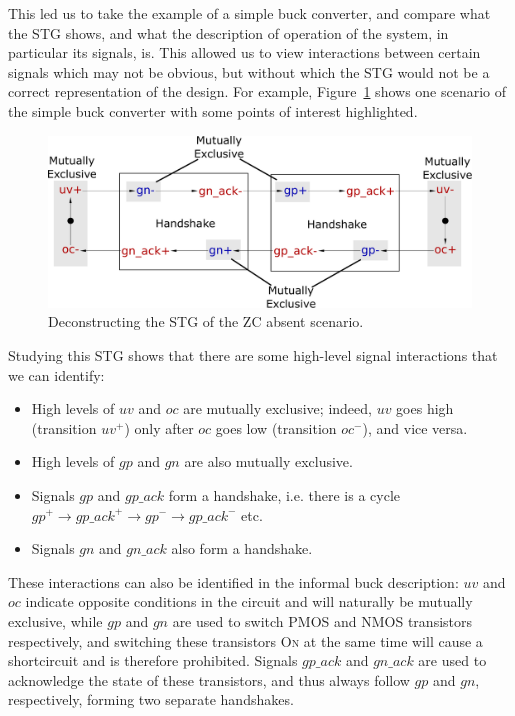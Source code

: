 \documentclass[british, journal]{IEEEtran}
\newcommand{\noun}[1]{\textsc{#1}}
\begin{document}
This led us to take the example of a simple buck converter, and compare what
the STG shows, and what the description of operation of the system, in
particular its signals, is. This allowed us to view interactions between
certain signals which may not be obvious, but without which the STG would not
be a correct representation of the design. For example,
Figure~\ref{fig:stg-breakdown} shows one scenario of the simple buck converter
with some points of interest highlighted.

\begin{figure}[t]
\begin{centering}
\includegraphics[scale=0.225]{Images/stg-breakdown}
\par
\protect\caption{\label{fig:stg-breakdown}Deconstructing the STG of the ZC
absent scenario.}
\par\end{centering}
\vspace{-4mm}
\end{figure}

Studying this STG shows that there are some high-level signal interactions that
we can identify:
\begin{itemize}
\item High levels of $uv$ and $oc$ are mutually exclusive; indeed, $uv$ goes
high (transition $uv^{+}$) only after $oc$ goes low (transition $oc^{-}$), and
vice
versa.
\item High levels of $gp$ and $gn$ are also mutually exclusive.
\item Signals $gp$ and $gp\_ack$ form a handshake, i.e. there is a cycle
$gp^{+} \rightarrow gp\_ack^{+} \rightarrow gp^{-} \rightarrow gp\_ack^{-}$ etc.\item Signals $gn$ and $gn\_ack$ also form a handshake.
\end{itemize}

These interactions can also be identified in the informal buck description:
$uv$ and $oc$ indicate opposite conditions in the circuit and will naturally be
mutually exclusive, while $gp$ and $gn$ are used to switch PMOS and NMOS
transistors respectively, and switching these transistors \noun{On} at the same
time will cause a shortcircuit and is therefore prohibited. Signals $gp\_ack$
and $gn\_ack$ are used to acknowledge the state of these transistors, and thus
always follow $gp$ and $gn$, respectively, forming two separate handshakes.
\end{document}
